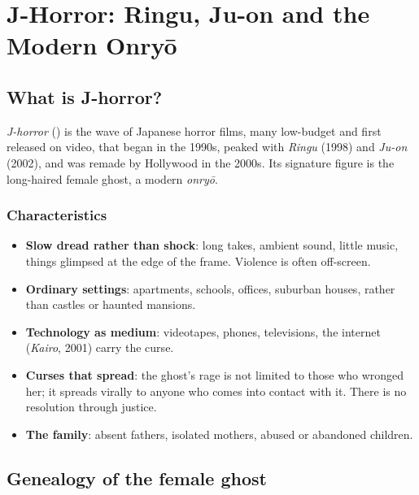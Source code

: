 \chapter{J-Horror: Ringu, Ju-on and the Modern Onryō}

\section{What is J-horror?}

\begin{definition}[J-horror]
\emph{J-horror} () is the wave of Japanese horror films, many
low-budget and first released on video, that began in the 1990s, peaked with
\emph{Ringu} (1998) and \emph{Ju-on} (2002), and was remade by Hollywood in the 2000s. Its
signature figure is the long-haired female ghost, a modern \emph{onryō}.
\end{definition}

\subsection{Characteristics}

\begin{itemize}
  \item \textbf{Slow dread rather than shock}: long takes, ambient sound, little music,
        things glimpsed at the edge of the frame. Violence is often off-screen.
  \item \textbf{Ordinary settings}: apartments, schools, offices, suburban houses, rather
        than castles or haunted mansions.
  \item \textbf{Technology as medium}: videotapes, phones, televisions, the internet
        (\emph{Kairo}, 2001) carry the curse.
  \item \textbf{Curses that spread}: the ghost's rage is not limited to those who wronged
        her; it spreads virally to anyone who comes into contact with it. There is no
        resolution through justice.
  \item \textbf{The family}: absent fathers, isolated mothers, abused or abandoned children.
\end{itemize}

\section{Genealogy of the female ghost}

